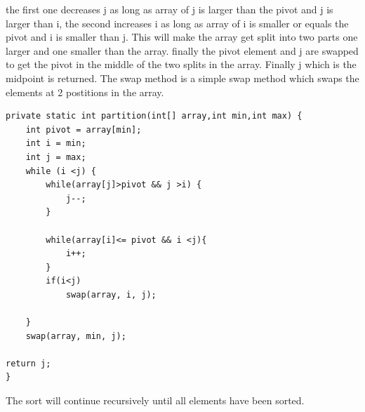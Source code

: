 \documentclass[a4paper,11pt]{article}
\begin{document}
the first one decreases j as long as array of j is larger than the pivot and j is larger than i, the second increases i as long as array of i is smaller or equals the pivot and i is smaller than j. This will make the array get split into two parts one larger and one smaller than the array. finally the pivot element and j are swapped to get the pivot in the middle of the two splits in the array. 
Finally j which is the midpoint is returned. The swap method is a simple swap method which swaps the elements at 2 postitions in the array.
\begin{verbatim}
private static int partition(int[] array,int min,int max) {
    int pivot = array[min];
    int i = min;
    int j = max;
    while (i <j) {
        while(array[j]>pivot && j >i) {
            j--;
        }

        while(array[i]<= pivot && i <j){
            i++;
        }
        if(i<j)
            swap(array, i, j);

    }
    swap(array, min, j);

return j;
}  
\end{verbatim}
The sort will continue recursively until all elements have been sorted.
\end{document}
